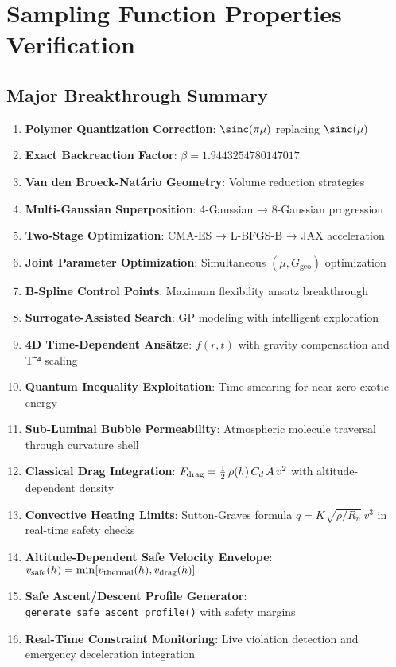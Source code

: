 \documentclass[11pt]{article}
\begin{document}
\section{Sampling Function Properties Verification}

\subsection{Major Breakthrough Summary}

\begin{enumerate}
\item \textbf{Polymer Quantization Correction}: $\sinc(\pi\mu)$ replacing $\sinc(\mu)$
\item \textbf{Exact Backreaction Factor}: $\beta = 1.9443254780147017$
\item \textbf{Van den Broeck-Natário Geometry}: Volume reduction strategies
\item \textbf{Multi-Gaussian Superposition}: 4-Gaussian → 8-Gaussian progression
\item \textbf{Two-Stage Optimization}: CMA-ES → L-BFGS-B → JAX acceleration
\item \textbf{Joint Parameter Optimization}: Simultaneous $(\mu, G_{\text{geo}})$ optimization
\item \textbf{B-Spline Control Points}: Maximum flexibility ansatz breakthrough
\item \textbf{Surrogate-Assisted Search}: GP modeling with intelligent exploration
\item \textbf{4D Time-Dependent Ansätze}: $f(r,t)$ with gravity compensation and T⁻⁴ scaling
\item \textbf{Quantum Inequality Exploitation}: Time-smearing for near-zero exotic energy
\item \textbf{Sub-Luminal Bubble Permeability}: Atmospheric molecule traversal through curvature shell
\item \textbf{Classical Drag Integration}: $F_{\rm drag}=\tfrac12\,\rho(h)\,C_d\,A\,v^2$ with altitude-dependent density
\item \textbf{Convective Heating Limits}: Sutton-Graves formula $q=K\sqrt{\rho/R_n}\,v^3$ in real-time safety checks
\item \textbf{Altitude-Dependent Safe Velocity Envelope}: $v_{\rm safe}(h)=\min[v_{\rm thermal}(h),v_{\rm drag}(h)]$
\item \textbf{Safe Ascent/Descent Profile Generator}: \texttt{generate\_safe\_ascent\_profile()} with safety margins
\item \textbf{Real-Time Constraint Monitoring}: Live violation detection and emergency deceleration integration

\end{enumerate}
\end{document}
